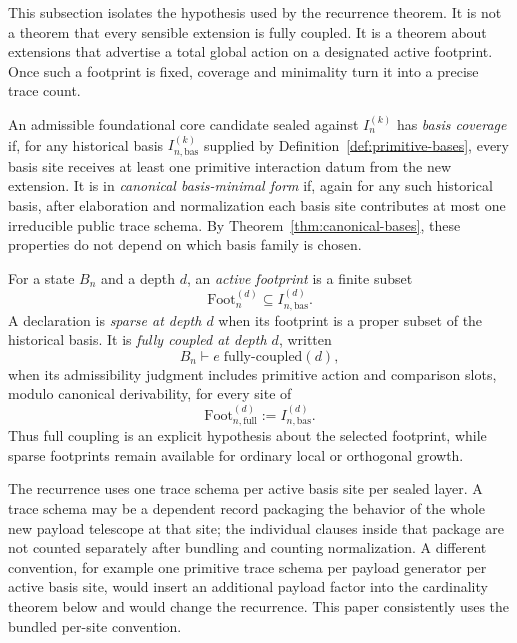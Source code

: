 \documentclass{lmcs}
\begin{document}
This subsection isolates the hypothesis used by the recurrence theorem.  It is not a theorem
that every sensible extension is fully coupled.  It is a theorem about extensions that advertise
a total global action on a designated active footprint.  Once such a footprint is fixed,
coverage and minimality turn it into a precise trace count.

\begin{defi}
An admissible foundational core candidate sealed against \(I_n^{(k)}\) has \emph{basis
coverage} if, for any historical basis \(I_{n,\mathrm{bas}}^{(k)}\) supplied by
Definition~\ref{def:primitive-bases}, every basis site receives at least one primitive
interaction datum from the new extension.  It is in \emph{canonical basis-minimal form} if,
again for any such historical
basis, after elaboration and normalization each basis site contributes at most one irreducible
public trace schema.  By Theorem~\ref{thm:canonical-bases}, these properties do not depend on
which basis family is chosen.
\end{defi}

\begin{defi}
\label{def:full-coupling}
For a state \(B_n\) and a depth \(d\), an \emph{active footprint} is a finite subset
\[
  \mathrm{Foot}^{(d)}_n \subseteq I_{n,\mathrm{bas}}^{(d)}.
\]
A declaration is \emph{sparse at depth \(d\)} when its footprint is a proper subset of the
historical basis.  It is \emph{fully coupled at depth \(d\)}, written
\[
  B_n \vdash e\;\mathrm{fully\mbox{-}coupled}(d),
\]
when its admissibility judgment includes primitive action and comparison slots, modulo
canonical derivability, for every site of
\[
  \mathrm{Foot}^{(d)}_{n,\mathrm{full}} := I_{n,\mathrm{bas}}^{(d)}.
\]
Thus full coupling is an explicit hypothesis about the selected footprint, while sparse
footprints remain available for ordinary local or orthogonal growth.
\end{defi}

\begin{rem}
\label{rem:trace-counting-convention}
The recurrence uses one trace schema per active basis site per sealed layer.  A trace schema
may be a dependent record packaging the behavior of the whole new payload telescope at that
site; the individual clauses inside that package are not counted separately after bundling and
counting normalization.  A different convention, for example one primitive trace schema per
payload generator per active basis site, would insert an additional payload factor into the
cardinality theorem below and would change the recurrence.  This paper consistently uses the
bundled per-site convention.
\end{rem}
\end{document}
